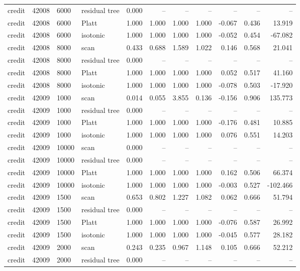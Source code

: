 \begin{tabular}{lrllrrrrrrr}
credit & 42008 & 6000 & residual tree & 0.000 & -- & -- & -- & -- & -- & -- \\
credit & 42008 & 6000 & Platt & 1.000 & 1.000 & 1.000 & 1.000 & -0.067 & 0.436 & 13.919 \\
credit & 42008 & 6000 & isotonic & 1.000 & 1.000 & 1.000 & 1.000 & -0.052 & 0.454 & -67.082 \\
credit & 42008 & 8000 & scan & 0.433 & 0.688 & 1.589 & 1.022 & 0.146 & 0.568 & 21.041 \\
credit & 42008 & 8000 & residual tree & 0.000 & -- & -- & -- & -- & -- & -- \\
credit & 42008 & 8000 & Platt & 1.000 & 1.000 & 1.000 & 1.000 & 0.052 & 0.517 & 41.160 \\
credit & 42008 & 8000 & isotonic & 1.000 & 1.000 & 1.000 & 1.000 & -0.078 & 0.503 & -17.920 \\
credit & 42009 & 1000 & scan & 0.014 & 0.055 & 3.855 & 0.136 & -0.156 & 0.906 & 135.773 \\
credit & 42009 & 1000 & residual tree & 0.000 & -- & -- & -- & -- & -- & -- \\
credit & 42009 & 1000 & Platt & 1.000 & 1.000 & 1.000 & 1.000 & -0.176 & 0.481 & 10.885 \\
credit & 42009 & 1000 & isotonic & 1.000 & 1.000 & 1.000 & 1.000 & 0.076 & 0.551 & 14.203 \\
credit & 42009 & 10000 & scan & 0.000 & -- & -- & -- & -- & -- & -- \\
credit & 42009 & 10000 & residual tree & 0.000 & -- & -- & -- & -- & -- & -- \\
credit & 42009 & 10000 & Platt & 1.000 & 1.000 & 1.000 & 1.000 & 0.162 & 0.506 & 66.374 \\
credit & 42009 & 10000 & isotonic & 1.000 & 1.000 & 1.000 & 1.000 & -0.003 & 0.527 & -102.466 \\
credit & 42009 & 1500 & scan & 0.653 & 0.802 & 1.227 & 1.082 & 0.062 & 0.666 & 51.794 \\
credit & 42009 & 1500 & residual tree & 0.000 & -- & -- & -- & -- & -- & -- \\
credit & 42009 & 1500 & Platt & 1.000 & 1.000 & 1.000 & 1.000 & -0.076 & 0.587 & 26.992 \\
credit & 42009 & 1500 & isotonic & 1.000 & 1.000 & 1.000 & 1.000 & -0.045 & 0.577 & 28.182 \\
credit & 42009 & 2000 & scan & 0.243 & 0.235 & 0.967 & 1.148 & 0.105 & 0.666 & 52.212 \\
credit & 42009 & 2000 & residual tree & 0.000 & -- & -- & -- & -- & -- & -- \\

\end{tabular}
